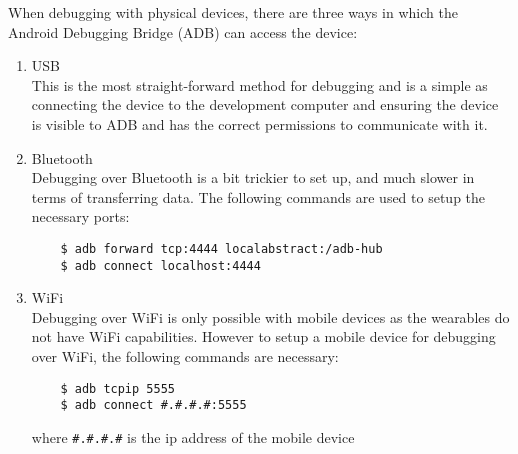 When debugging with physical devices, there are three ways in which the Android
Debugging Bridge (ADB) can access the device:

\begin{enumerate}

\item USB\\
    This is the most straight-forward method for debugging and is a simple as
    connecting the device to the development computer and ensuring the device is
    visible to ADB and has the correct permissions to communicate with it.
\item Bluetooth\\
    Debugging over Bluetooth is a bit trickier to set up, and much slower in
    terms of transferring data. The following commands are used to setup the
    necessary ports:
    \begin{lstlisting}
    $ adb forward tcp:4444 localabstract:/adb-hub
    $ adb connect localhost:4444
    \end{lstlisting}
\item WiFi\\
    Debugging over WiFi is only possible with mobile devices as the wearables
    do not have WiFi capabilities. However to setup a mobile device for
    debugging over WiFi, the following commands are necessary:
    \begin{lstlisting}
    $ adb tcpip 5555
    $ adb connect #.#.#.#:5555
    \end{lstlisting}
    where \texttt{\#.\#.\#.\#} is the ip address of the mobile device
\end{enumerate}
